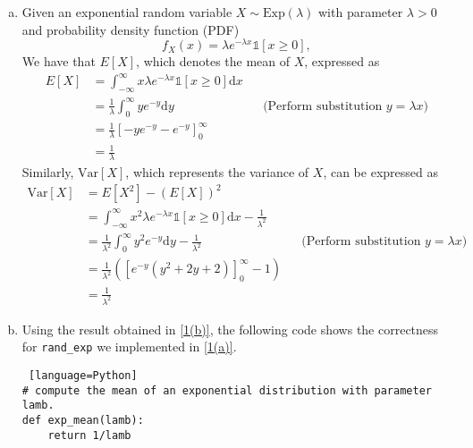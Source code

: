 \begin{enumerate} [(a)]
\begin{lstlisting}[language=Python]
# Draw n samples from an exponential distribution with parameter lamb.
def rand_exp(lamb, n):
	u = npr.rand(n)
	# Using inverse CDF method
	x = -np.log(u)/lamb
	return x
	\end{lstlisting}
	\item \label{1(b)} Given an exponential random variable $X \sim \mathrm{Exp}(\lambda)$ with parameter $\lambda > 0$ and probability density function (\textsc{PDF})
	\begin{equation*}
		f_X(x) = \lambda e^{-\lambda x} \mathds{1}\!\left[x \geq 0\right],
	\end{equation*}
	We have that $E[X]$, which denotes the mean of $X$, expressed as
	\begin{equation*}
		\begin{aligned}
			E[X] &= \int_{-\infty}^{\infty} x\lambda e^{-\lambda x} \mathds{1}\!\left[x \geq 0\right]\!\mathrm{d}x \\
			&= \frac{1}{\lambda} \int_{0}^{\infty} y e^{-y} \mathrm{d}y && \text{(Perform substitution $y=\lambda x$)} \\
			&= \frac{1}{\lambda} \left[-ye^{-y} - e^{-y}\right]_{0}^{\infty} \\
			&= \frac{1}{\lambda}			
		\end{aligned}
	\end{equation*}
	Similarly, $\mathrm{Var}[X]$, which represents the variance of $X$, can be expressed as
	\begin{equation*}
		\begin{aligned}
			\mathrm{Var}[X] &= E\!\left[X^2\right] - \left(E[X]\right)^2 \\
			&= \int_{-\infty}^{\infty} x^2 \lambda e^{-\lambda x} \mathds{1}\!\left[x \geq 0\right]\!\mathrm{d}x - \frac{1}{\lambda^2} \\
			&= \frac{1}{\lambda^2} \int_{0}^{\infty} y^2 e^{-y} \mathrm{d}y - \frac{1}{\lambda^2} && \text{(Perform substitution $y=\lambda x$)} \\
			&= \frac{1}{\lambda^2} \left(\left[e^{-y}\left(y^2+2y+2\right)\right]_{0}^{\infty} - 1\right) \\
			&= \frac{1}{\lambda^2}
		\end{aligned}
	\end{equation*}
	\item \label{1(c)} Using the result obtained in \ref{1(b)}, the following code shows the correctness for \verb|rand_exp| we implemented in \ref{1(a)}.
	\begin{lstlisting} [language=Python]
# compute the mean of an exponential distribution with parameter lamb.
def exp_mean(lamb):
	return 1/lamb


\end{lstlisting}
\end{enumerate}
